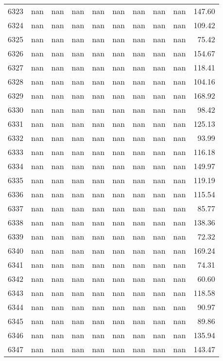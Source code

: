 \begin{tabular}{lrrrrrrrrr}
6323 & nan & nan & nan & nan & nan & nan & nan & nan & 147.60 \\
6324 & nan & nan & nan & nan & nan & nan & nan & nan & 109.42 \\
6325 & nan & nan & nan & nan & nan & nan & nan & nan & 75.42 \\
6326 & nan & nan & nan & nan & nan & nan & nan & nan & 154.67 \\
6327 & nan & nan & nan & nan & nan & nan & nan & nan & 118.41 \\
6328 & nan & nan & nan & nan & nan & nan & nan & nan & 104.16 \\
6329 & nan & nan & nan & nan & nan & nan & nan & nan & 168.92 \\
6330 & nan & nan & nan & nan & nan & nan & nan & nan & 98.42 \\
6331 & nan & nan & nan & nan & nan & nan & nan & nan & 125.13 \\
6332 & nan & nan & nan & nan & nan & nan & nan & nan & 93.99 \\
6333 & nan & nan & nan & nan & nan & nan & nan & nan & 116.18 \\
6334 & nan & nan & nan & nan & nan & nan & nan & nan & 149.97 \\
6335 & nan & nan & nan & nan & nan & nan & nan & nan & 119.19 \\
6336 & nan & nan & nan & nan & nan & nan & nan & nan & 115.54 \\
6337 & nan & nan & nan & nan & nan & nan & nan & nan & 85.77 \\
6338 & nan & nan & nan & nan & nan & nan & nan & nan & 138.36 \\
6339 & nan & nan & nan & nan & nan & nan & nan & nan & 72.32 \\
6340 & nan & nan & nan & nan & nan & nan & nan & nan & 169.24 \\
6341 & nan & nan & nan & nan & nan & nan & nan & nan & 74.31 \\
6342 & nan & nan & nan & nan & nan & nan & nan & nan & 60.60 \\
6343 & nan & nan & nan & nan & nan & nan & nan & nan & 118.58 \\
6344 & nan & nan & nan & nan & nan & nan & nan & nan & 90.97 \\
6345 & nan & nan & nan & nan & nan & nan & nan & nan & 89.86 \\
6346 & nan & nan & nan & nan & nan & nan & nan & nan & 135.94 \\
6347 & nan & nan & nan & nan & nan & nan & nan & nan & 143.47 \\

\end{tabular}
